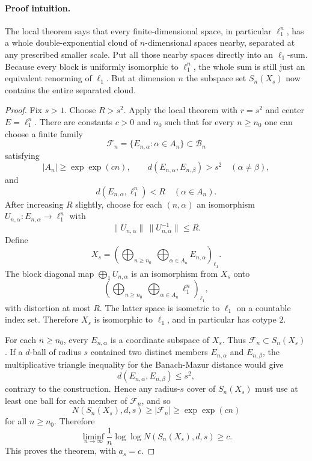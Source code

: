 \documentclass[11pt]{article}
\newcommand{\Sn}{S_n}
\newcommand{\dist}{d}
\begin{document}
\paragraph{Proof intuition.}
The local theorem says that every finite-dimensional space, in particular
$\ell_1^n$, has a whole double-exponential cloud of $n$-dimensional spaces
nearby, separated at any prescribed smaller scale.  Put all those nearby
spaces directly into an $\ell_1$-sum.  Because every block is uniformly
isomorphic to $\ell_1^n$, the whole sum is still just an equivalent renorming
of $\ell_1$.  But at dimension $n$ the subspace set $\Sn(X_s)$ now contains
the entire separated cloud.

\begin{proof}
Fix $s>1$.  Choose $R>s^2$.  Apply the local theorem with $r=s^2$ and center
$E=\ell_1^n$.  There are constants $c>0$ and $n_0$ such that for every
$n\ge n_0$ one can choose a finite family
\[
   \mathcal F_n=\{E_{n,\alpha}:\alpha\in A_n\}\subset \mathcal B_n
\]
satisfying
\[
   |A_n|\ge \exp\exp(cn),\qquad
   \dist(E_{n,\alpha},E_{n,\beta})>s^2\quad(\alpha\ne\beta),
\]
and
\[
   \dist(E_{n,\alpha},\ell_1^n)<R\quad(\alpha\in A_n).
\]
After increasing $R$ slightly, choose for each $(n,\alpha)$ an isomorphism
$U_{n,\alpha}:E_{n,\alpha}\to \ell_1^n$ with
\[
   \|U_{n,\alpha}\|\,\|U_{n,\alpha}^{-1}\|\le R .
\]
Define
\[
   X_s=\left(\bigoplus_{n\ge n_0}\ \bigoplus_{\alpha\in A_n}
        E_{n,\alpha}\right)_{\ell_1}.
\]
The block diagonal map $\bigoplus_1 U_{n,\alpha}$ is an isomorphism from
$X_s$ onto
\[
   \left(\bigoplus_{n\ge n_0}\ \bigoplus_{\alpha\in A_n}
        \ell_1^n\right)_{\ell_1},
\]
with distortion at most $R$.  The latter space is isometric to $\ell_1$ on a
countable index set.  Therefore $X_s$ is isomorphic to $\ell_1$, and in
particular has cotype $2$.

For each $n\ge n_0$, every $E_{n,\alpha}$ is a coordinate subspace of $X_s$.
Thus $\mathcal F_n\subset \Sn(X_s)$.  If a $\dist$-ball of radius $s$ contained
two distinct members $E_{n,\alpha}$ and $E_{n,\beta}$, the multiplicative
triangle inequality for the Banach-Mazur distance would give
\[
   \dist(E_{n,\alpha},E_{n,\beta})\le s^2,
\]
contrary to the construction.  Hence any radius-$s$ cover of $\Sn(X_s)$ must
use at least one ball for each member of $\mathcal F_n$, and so
\[
   N(\Sn(X_s),\dist,s)\ge |\mathcal F_n|\ge \exp\exp(cn)
\]
for all $n\ge n_0$.  Therefore
\[
   \liminf_{n\to\infty} \frac{1}{n}
   \log\log N(\Sn(X_s),\dist,s) \ge c.
\]
This proves the theorem, with $a_s=c$.
\end{proof}
\end{document}
